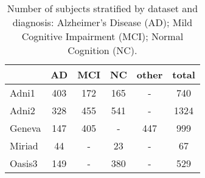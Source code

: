 
\begin{table}
\centering
\caption{
Number of subjects stratified by dataset and diagnosis:
Alzheimer's Disease (AD);
Mild Cognitive Impairment (MCI);
Normal Cognition (NC).
}
\label{tab:dx_stratification}
\begin{tabular}{lccccc}
\toprule
   &     AD &    MCI &     NC &  other & total \\
\midrule
Adni1   &  403 &  172 &  165 &   -  &  740 \\
Adni2   &  328 &  455 &  541 &   -  & 1324 \\
Geneva  &  147 &  405 &    - &  447 &  999 \\
Miriad  &   44 &   -  &   23 &   -  &   67 \\
Oasis3  &  149 &    - &  380 &   -  &  529 \\
\bottomrule
\end{tabular}
\end{table}


